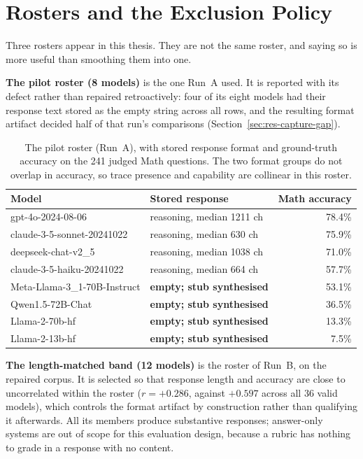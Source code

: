 \section{Rosters and the Exclusion Policy}\label{sec:exp-arena}\label{sec:exp-rosters}

Three rosters appear in this thesis. They are not the same roster, and
saying so is more useful than smoothing them into one.

\textbf{The pilot roster (8 models)} is the one Run~A used. It is
reported with its defect rather than repaired retroactively: four of
its eight models had their response text stored as the empty string
across all rows, and the resulting format artifact decided half of that
run's comparisons (Section~\ref{sec:res-capture-gap}).

\begin{table}[h]
\centering
\caption{The pilot roster (Run~A), with stored response format and
ground-truth accuracy on the 241 judged Math questions. The two format
groups do not overlap in accuracy, so trace presence and capability are
collinear in this roster.}
\label{tab:model-roster-pilot}
\begin{tabular}{llr}
\toprule
Model & Stored response & Math accuracy \\
\midrule
gpt-4o-2024-08-06 & reasoning, median 1211 ch & 78.4\% \\
claude-3-5-sonnet-20241022 & reasoning, median 630 ch & 75.9\% \\
deepseek-chat-v2\_5 & reasoning, median 1038 ch & 71.0\% \\
claude-3-5-haiku-20241022 & reasoning, median 664 ch & 57.7\% \\
\addlinespace
Meta-Llama-3\_1-70B-Instruct & \textbf{empty; stub synthesised} & 53.1\% \\
Qwen1.5-72B-Chat & \textbf{empty; stub synthesised} & 36.5\% \\
Llama-2-70b-hf & \textbf{empty; stub synthesised} & 13.3\% \\
Llama-2-13b-hf & \textbf{empty; stub synthesised} & 7.5\% \\
\bottomrule
\end{tabular}
\end{table}

\textbf{The length-matched band (12 models)} is the roster of Run~B, on
the repaired corpus. It is selected so that response length and
accuracy are close to uncorrelated within the roster
($r = +0.286$, against $+0.597$ across all 36 valid models), which
controls the format artifact by construction rather than qualifying it
afterwards. All its members produce substantive responses; answer-only
systems are out of scope for this evaluation design, because a rubric
has nothing to grade in a response with no content.


